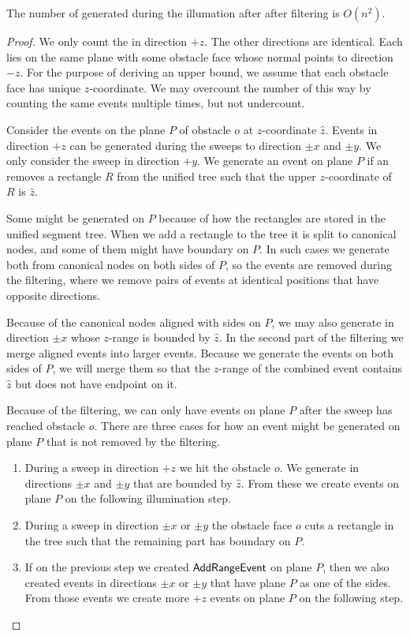 \documentclass[english,gradu]{tktltiki2018}
\begin{document}
\begin{lem}\label{lem:adde3}The number of \addEs generated during the illumation after after filtering is $O(n^2)$.\end{lem}
\begin{proof}
We only count the \addEs in direction $+z$.
The other directions are identical.
Each \addE lies on the same plane with some obstacle face whose normal points to direction $-z$.
For the purpose of deriving an upper bound, we assume that each obstacle face has unique $z$-coordinate.
We may overcount the number of \addEs this way by counting the same events multiple times, but not undercount.

Consider the events on the plane $P$ of obstacle $o$ at $z$-coordinate $\hat{z}$.
Events in direction $+z$ can be generated during the sweeps to direction $\pm x$ and $\pm y$.
We only consider the sweep in direction $+y$.
We generate an event on plane $P$ if an \obsE removes a rectangle $R$ from the unified tree such that the upper $z$-coordinate of $R$ is $\hat{z}$.

Some \addEs might be generated on $P$ because of how the rectangles are stored in the unified segment tree.
When we add a rectangle to the tree it is split to canonical nodes, and some of them might have boundary on $P$.
In such cases we generate \addEs both from canonical nodes on both sides of $P$, so the events are removed during the filtering, where we remove pairs of events at identical positions that have opposite directions.

Because of the canonical nodes aligned with sides on $P$, we may also generate \addEs in direction $\pm x$ whose $z$-range is bounded by $\hat{z}$.
In the second part of the filtering we merge aligned events into larger events.
Because we generate the events on both sides of $P$, we will merge them so that the $z$-range of the combined event contains $\hat{z}$ but does not have endpoint on it.

Because of the filtering, we can only have events on plane $P$ after the sweep has reached obstacle $o$.
There are three cases for how an event might be generated on plane $P$ that is not removed by the filtering.
\begin{enumerate}
\item During a sweep in direction $+z$ we hit the obstacle $o$.
	We generate \addEs in directions $\pm x$ and $\pm y$ that are bounded by $\hat{z}$.
	From these \addEs we create events on plane $P$ on the following illumination step.
\item During a sweep in direction $\pm x$ or $\pm y$ the obstacle face $o$ cuts a rectangle in the tree such that the remaining part has boundary on $P$.
\item If on the previous step we created $\mathsf{AddRangeEvent}$ on plane $P$, then we also created events in directions $\pm x$ or $\pm y$ that have plane $P$ as one of the sides.
	From those events we create more $+z$ events on plane $P$ on the following step.
\end{enumerate}


\end{proof}
\end{document}
